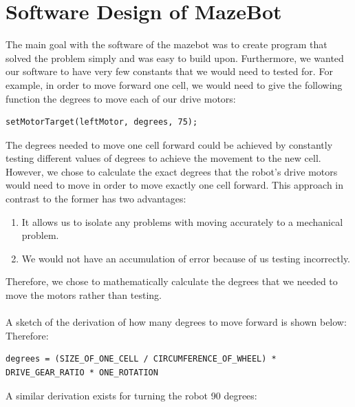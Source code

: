 \documentclass[11pt]{article}
\begin{document}
\section{Software Design of MazeBot}
The main goal with the software of the mazebot was to create program that solved the problem simply and was easy to build upon. Furthermore, we wanted our software to have very few constants that we would need to tested for. For example, in order to move forward one cell, we would need to give the following function the degrees to move each of our drive motors:
\begin{verbatim}
setMotorTarget(leftMotor, degrees, 75);
\end{verbatim}
The degrees needed to move one cell forward could be achieved by constantly testing different values of degrees to achieve the movement to the new cell. However, we chose to calculate the exact degrees that the robot's drive motors would need to move in order to move exactly one cell forward. This approach in contrast to the former has two advantages: 
\begin{enumerate}
\item It allows us to isolate any problems with moving accurately to a mechanical problem.
\item We would not have an accumulation of error because of us testing incorrectly.
\end{enumerate}
Therefore, we chose to mathematically calculate the degrees that we needed to move the motors rather than testing.\\\\
A sketch of the derivation of how many degrees to move forward is shown below: %
\\
Therefore:
\begin{verbatim}
degrees = (SIZE_OF_ONE_CELL / CIRCUMFERENCE_OF_WHEEL) * DRIVE_GEAR_RATIO * ONE_ROTATION
\end{verbatim}
A similar derivation exists for turning the robot 90 degrees: %

\newpage

\end{document}
